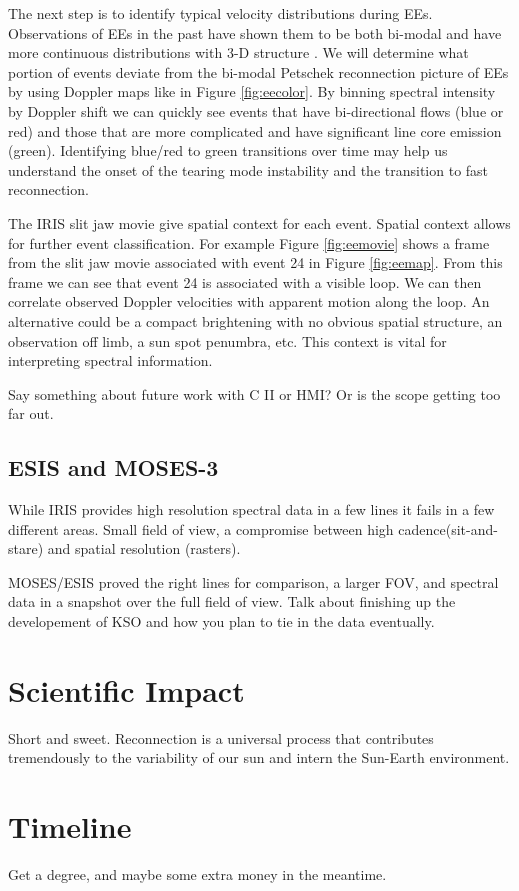 \documentclass[]{aastex6}
\begin{document}
	The next step is to identify typical velocity distributions during EEs.  Observations of EEs in the past have shown them to be both bi-modal \citep{Innes1997,Rust2017} and have more continuous distributions with 3-D structure \citep{Fox2010,Innes2015,Rouppe2017}.  We will determine what portion of events deviate from the bi-modal Petschek reconnection picture of EEs by using Doppler maps like in Figure \ref{fig:eecolor}. By binning spectral intensity by Doppler shift we can quickly see events that have bi-directional flows (blue or red) and those that are more complicated and have significant line core emission (green).  Identifying blue/red to green transitions over time may help us understand the onset of the tearing mode instability and the transition to fast reconnection.
	
	The IRIS slit jaw movie give spatial context for each event.  Spatial context allows for further event classification. For example Figure \ref{fig:eemovie} shows a frame from the slit jaw movie associated with event 24 in Figure \ref{fig:eemap}.  From this frame we can see that event 24 is associated with a visible loop.  We can then correlate observed Doppler velocities with apparent motion along the loop.  An alternative could be a compact brightening with no obvious spatial structure, an observation off limb, a sun spot penumbra, etc.  This context is vital for interpreting spectral information.
	
	Say something about future work with C II or HMI?  Or is the scope getting too far out.
	

	

	\subsection{ESIS and MOSES-3}
	While IRIS provides high resolution spectral data in a few lines it fails in a few different areas.  Small field of view, a compromise between high cadence(sit-and-stare) and spatial resolution (rasters).  
	
	MOSES/ESIS proved the right lines for comparison, a larger FOV, and spectral data in a snapshot over the full field of view.  Talk about finishing up the developement of KSO and how you plan to tie in the data eventually.


\section{Scientific Impact}
%
Short and sweet.  Reconnection is a universal process that contributes tremendously to the variability of our sun and intern the Sun-Earth environment.

 
\section{Timeline}
Get a  degree, and maybe some extra money in the meantime.





	
\end{document}
